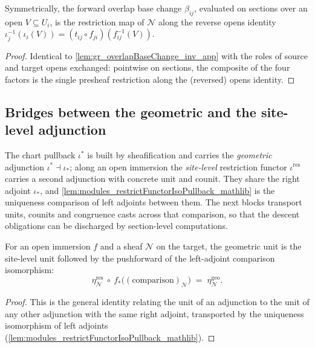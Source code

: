 \begin{lemma}\leanok
  \label{lem:gr_overlapBaseChange_hom_app}
  Symmetrically, the forward overlap base change \(\beta_{ij}\), evaluated on sections
  over an open \(V \subseteq U_i\), is the restriction map of \(\mathcal{N}\) along the
  reverse opens identity \(\iota_j^{-1}(\iota_i(V)) = (t_{ij}\circ f_{ji})(f_{ij}^{-1}(V))\).
\end{lemma}
\begin{proof}
  \leanok
  Identical to \cref{lem:gr_overlapBaseChange_inv_app} with the roles of source and
  target opens exchanged: pointwise on sections, the composite of the four factors is
  the single presheaf restriction along the (reversed) opens identity.
\end{proof}

\subsection{Bridges between the geometric and the site-level adjunction}

The chart pullback \(\iota^{*}\) is built by sheafification and carries the
\emph{geometric} adjunction \(\iota^{*} \dashv \iota_{*}\); along an open immersion the
\emph{site-level} restriction functor \(\iota^{\mathrm{res}}\) carries a second
adjunction with concrete unit and counit. They share the right adjoint \(\iota_{*}\),
and \cref{lem:modules_restrictFunctorIsoPullback_mathlib} is the uniqueness comparison
of left adjoints between them. The next blocks transport units, counits and
congruence casts across that comparison, so that the descent obligations can be
discharged by section-level computations.

\begin{lemma}\leanok
  \label{lem:gr_restrictAdjunction_unit_iso}
  For an open immersion \(f\) and a sheaf \(\mathcal{N}\) on the target, the geometric
  unit is the site-level unit followed by the pushforward of the left-adjoint
  comparison isomorphism:
  \[
    \eta^{\mathrm{res}}_{\mathcal{N}}\ \circ\
      f_{*}\bigl((\text{comparison})_{\mathcal{N}}\bigr)
    \;=\; \eta^{\mathrm{geo}}_{\mathcal{N}}.
  \]
\end{lemma}
\begin{proof}
  \leanok
  This is the general identity relating the unit of an adjunction to the unit of any
  other adjunction with the same right adjoint, transported by the uniqueness
  isomorphism of left adjoints (\cref{lem:modules_restrictFunctorIsoPullback_mathlib}).
\end{proof}

